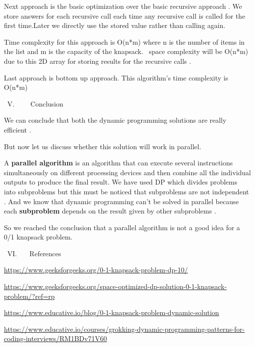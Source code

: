 \documentclass[letterpaper]{article}
\begin{document}
\begin{multicols}{2}
\bigskip

Next approach is the basic optimization over the basic recursive approach . We store answers for each recursive call
each time any recursive call is called for the first time.Later we directly use the stored value rather than calling
again. 

Time complexity for this approach is O(n*m) where n is the number of items in the list and m is the capacity of the
knapsack. \ space complexity will be O(n*m) due to this 2D array for storing results for the recursive calls .


\bigskip

Last approach is bottom up approach. This algorithm's time complexity is O(n*m)

{\mdseries
\ V. \ \ \ \ Conclusion }

We can conclude that both the dynamic programming solutions are really efficient .

But now let us discuss whether this solution will work in parallel. 


\bigskip

A \textbf{parallel algorithm} is an algorithm that can execute several instructions simultaneously on different
processing devices and then combine all the individual outputs to produce the final result. We have used DP which
divides problems into subproblems but this must be noticed that subproblems are not independent . And we know that
dynamic programming can't be solved in parallel because each \textbf{subproblem} depends on the result given by other
subproblems .


\bigskip

So we reached the conclusion that a parallel algorithm is not a good idea for a 0/1 knapsack problem.


\bigskip
{\mdseries
\ VI. \ \ \ References}

\url{https://www.geeksforgeeks.org/0-1-knapsack-problem-dp-10/}

\url{https://www.geeksforgeeks.org/space-optimized-dp-solution-0-1-knapsack-problem/?ref=rp}

\url{https://www.educative.io/blog/0-1-knapsack-problem-dynamic-solution}

\url{https://www.educative.io/courses/grokking-dynamic-programming-patterns-for-coding-interviews/RM1BDv71V60}


\bigskip
\end{multicols}
\end{document}
